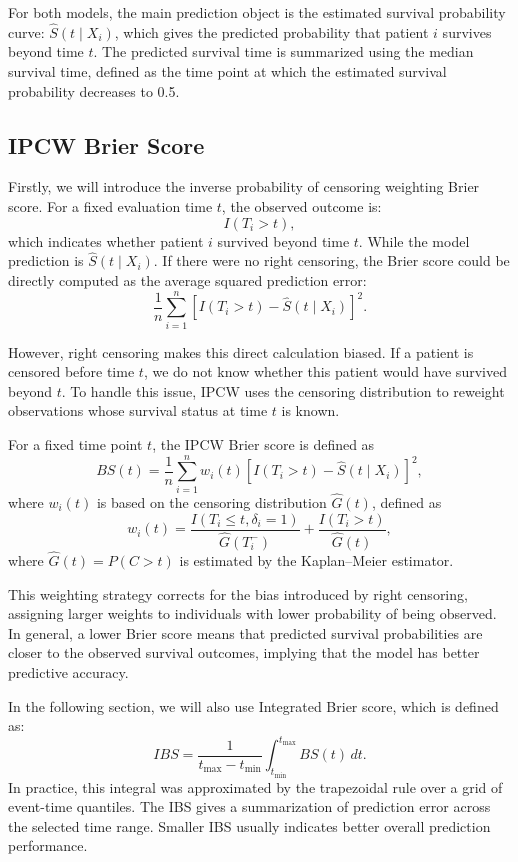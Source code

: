 \documentclass[11pt]{article}
\begin{document}
For both models, the main prediction object is the estimated survival probability curve:
$
\hat{S}(t \mid X_i)
$,
which gives the predicted probability that patient $i$ survives beyond time $t$. The predicted survival time is summarized using the median survival time, defined as the time point at which the estimated survival probability decreases to 0.5.

\subsection{IPCW Brier Score}
Firstly, we will introduce the inverse probability of censoring weighting Brier score. For a fixed evaluation time $t$, the observed outcome is:
\[
I(T_i > t),
\]
which indicates whether patient $i$ survived beyond time $t$. While the model prediction is $\hat{S}(t \mid X_i)$. If there were no right censoring, the Brier score could be directly computed as the average squared prediction error:
\[
\frac{1}{n}\sum_{i=1}^n
\left[I(T_i > t)-\hat{S}(t \mid X_i)\right]^2.
\]

However, right censoring makes this direct calculation biased. If a patient is censored before time $t$, we do not know whether this patient would have survived beyond $t$. To handle this issue, IPCW uses the censoring distribution to reweight observations whose survival status at time $t$ is known.

For a fixed time point $t$, the IPCW Brier score is defined as
\[
BS(t) = \frac{1}{n} \sum_{i=1}^{n} w_i(t)\left[I(T_i > t) - \hat{S}(t \mid X_i)\right]^2,
\]
where $w_i(t)$ is based on the censoring distribution $\hat{G}(t)$, defined as
\[
w_i(t) =
\frac{I(T_i \le t, \delta_i = 1)}{\hat{G}(T_i^-)} +
\frac{I(T_i > t)}{\hat{G}(t)},
\]
where $\hat{G}(t) = P(C > t)$ is estimated by the Kaplan--Meier estimator.

This weighting strategy corrects for the bias introduced by right censoring, assigning larger weights to individuals with lower probability of being observed. In general, a lower Brier score means that predicted survival probabilities are closer to the observed survival outcomes, implying that the model has better predictive accuracy.

In the following section, we will also use Integrated Brier score, which is defined as:
\[
IBS =
\frac{1}{t_{\max}-t_{\min}}
\int_{t_{\min}}^{t_{\max}} BS(t)\,dt.
\]
In practice, this integral was approximated by the trapezoidal rule over a grid of event-time quantiles. The IBS gives a summarization of prediction error across the selected time range. Smaller IBS usually indicates better overall prediction performance.
\end{document}
